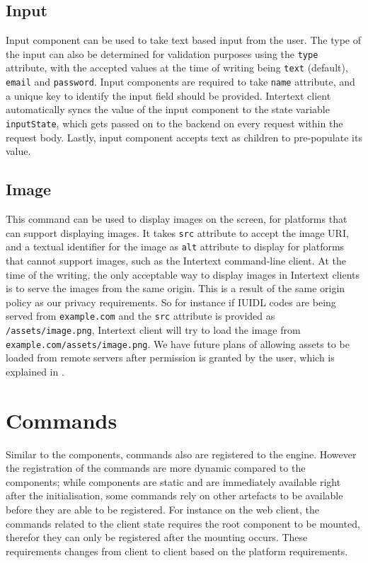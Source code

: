 \subsection{Input}

Input component can be used to take text based input from the user. The type of the input can also be determined for validation purposes using the \texttt{type} attribute, with the accepted values at the time of writing being \texttt{text} (default), \texttt{email} and \texttt{password}. Input components are required to take \texttt{name} attribute, and a unique key to identify the input field should be provided. Intertext client automatically syncs the value of the input component to the state variable \texttt{inputState}, which gets passed on to the backend on every request within the request body. Lastly, input component accepts text as children to pre-populate its value.

\subsection{Image}

This command can be used to display images on the screen, for platforms that can support displaying images. It takes \texttt{src} attribute to accept the image URI, and a textual identifier for the image as \texttt{alt} attribute to display for platforms that cannot support images, such as the Intertext command-line client. At the time of the writing, the only acceptable way to display images in Intertext clients is to serve the images from the same origin. This is a result of the same origin policy as our privacy requirements. So for instance if IUIDL codes are being served from \texttt{example.com} and the \texttt{src} attribute is provided as \texttt{/assets/image.png}, Intertext client will try to load the image from \texttt{example.com/assets/image.png}. We have future plans of allowing assets to be loaded from remote servers after permission is granted by the user, which is explained in .

\section{Commands}

Similar to the components, commands also are registered to the engine. However the registration of the commands are more dynamic compared to the components; while components are static and are immediately available right after the initialisation, some commands rely on other artefacts to be available before they are able to be registered. For instance on the web client, the commands related to the client state requires the root component to be mounted, therefor they can only be registered after the mounting occurs. These requirements changes from client to client based on the platform requirements.

